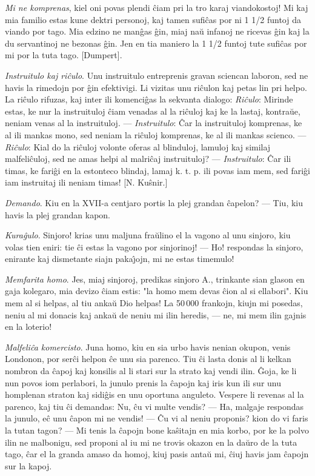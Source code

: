 \emph{Mi ne komprenas}, kiel oni povas plendi \^ciam pri la tro
karaj viandokostoj! Mi kaj mia familio estas kune dektri personoj,
kaj tamen sufi\^cas por ni 1 1/2 funtoj da viando por tago. Mia
edzino ne man\^gas \^gin, miaj na\u u infanoj ne ricevas \^gin kaj
la du servantinoj ne bezonas \^gin. Jen en tia maniero la 1 1/2
funtoj tute sufi\^cas por mi por la tuta tago. [Dumpert].

\emph{Instruitulo kaj ri\^culo}. Unu instruitulo entreprenis gravan
sciencan la\-bo\-ron, sed ne havis la rimedojn por \^gin efektivigi.
Li vizitas unu ri\^culon kaj petas lin pri helpo. La ri\^culo
rifuzas, kaj inter ili komenci\^gas la sekvanta dialogo: {\sl
Ri\^culo}: Mirinde estas, ke nur la instruituloj \^ciam venadas al
la ri\^culoj kaj ke la lastaj, kontra\u ue, neniam venas al la
instruituloj. --- {\sl Instruitulo}: \^Car la instruituloj
komprenas, ke al ili mankas mono, sed neniam la ri\^culoj komprenas,
ke al ili mankas scienco.
--- {\sl Ri\^culo}: Kial do la ri\^culoj volonte oferas al blinduloj,
lamuloj kaj similaj malfeli\^culoj, sed ne amas helpi al malri\^caj
instruituloj? --- {\sl Instruitulo}: \^Car ili timas, ke fari\^gi en
la estonteco blindaj, lamaj k. t. p. ili povas iam mem, sed fari\^gi
iam instruitaj ili neniam timas! [N. Ku\^snir.]

\emph{Demando}. Kiu en la XVII-a centjaro portis la plej grandan
\^capelon? --- Tiu, kiu havis la plej grandan kapon.

\emph{Kura\^gulo}. Sinjoro! krias unu maljuna fra\u ulino el la
vagono al unu sinjoro, kiu volas tien eniri: tie \^ci estas la
vagono por sinjorinoj! --- Ho! respondas la sinjoro, enirante kaj
dismetante siajn paka\^{\j}ojn, mi ne estas timemulo!

\emph{Memfarita homo}. Jes, miaj sinjoroj, predikas sinjoro A.,
trinkante sian glason en gaja kolegaro, mia devizo \^ciam estis:
"la homo mem devas \^cion al si ellabori". Kiu mem al si helpas,
al tiu anka\u u Dio helpas! La 50\,000 frankojn, kiujn mi posedas,
neniu al mi donacis kaj anka\u u de neniu mi ilin heredis, --- ne,
mi mem ilin gajnis en la loterio!

\emph{Malfeli\^ca komercisto}. Juna homo, kiu en sia urbo havis
nenian okupon, venis Londonon, por ser\^ci helpon \^ce unu sia
parenco. Tiu \^ci lasta donis al li kelkan nombron da \^capoj kaj
konsilis al li stari sur la strato kaj vendi ilin. \^Goja, ke li nun
povos iom perlabori, la junulo prenis la \^capojn kaj iris kun ili
sur unu homplenan straton kaj sidi\^gis en unu oportuna anguleto.
Vespere li revenas al la parenco, kaj tiu \^ci demandas: Nu, \^cu vi
multe vendis? --- Ha, malgaje respondas la junulo, e\^c unu \^capon
mi ne vendis! --- \^Cu vi al neniu proponis? kion do vi faris la
tutan tagon? --- Mi tenis la \^capojn bone ka\^sitajn en mia korbo,
por ke la polvo ilin ne malbonigu, sed proponi al iu mi ne trovis
okazon en la da\u uro de la tuta tago, \^car el la granda amaso da
homoj, kiuj pasis anta\u u mi, \^ciuj havis jam \^capojn sur la
kapoj.

